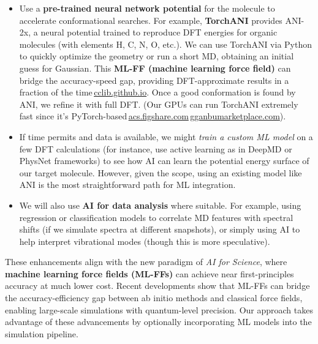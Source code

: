 \documentclass[11pt]{article}
\begin{document}
\begin{itemize}
\begin{itemize}
    \item Use a \textbf{pre-trained neural network potential} for the molecule to accelerate conformational searches. For example, \textbf{TorchANI} provides ANI-2x, a neural potential trained to reproduce DFT energies for organic molecules (with elements H, C, N, O, etc.). We can use TorchANI via Python to quickly optimize the geometry or run a short MD, obtaining an initial guess for Gaussian. This \textbf{ML-FF (machine learning force field)} can bridge the accuracy-speed gap, providing DFT-approximate results in a fraction of the time\,\href{https://cclib.github.io/\#:\~:text=Many\%20types\%20of\%20output\%20data,also\%20provided\%20for\%20interpreting\%20the}{cclib.github.io}. Once a good conformation is found by ANI, we refine it with full DFT. (Our GPUs can run TorchANI extremely fast since it’s PyTorch-based\,\href{https://acs.figshare.com/articles/journal_contribution/TorchANI_2_0_An_Extensible_High-Performance_Library_for_the_Design_Training_and_Use_of_NN-IPs/30388327\#:\~:text=TorchANI\%202.0\%3A\%20An\%20Extensible\%2C\%20High,inference\%2C\%20and\%20the\%20library}{acs.figshare.com}\,\href{https://gganbumarketplace.com/machine-learning/torchani-ani-family-neural-network-potentials-molecular-simulations/\#:\~:text=TorchANI\%20and\%20the\%20ANI\%20Family\%3A,of\%20pretrained\%20models\%20or}{gganbumarketplace.com}).
    \item If time permits and data is available, we might \emph{train a custom ML model} on a few DFT calculations (for instance, use active learning as in DeepMD or PhysNet frameworks) to see how AI can learn the potential energy surface of our target molecule. However, given the scope, using an existing model like ANI is the most straightforward path for ML integration.
    \item We will also use \textbf{AI for data analysis} where suitable. For example, using regression or classification models to correlate MD features with spectral shifts (if we simulate spectra at different snapshots), or simply using AI to help interpret vibrational modes (though this is more speculative).
  \end{itemize}
\end{itemize}

These enhancements align with the new paradigm of \emph{AI for Science}, where \textbf{machine learning force fields (ML-FFs)} can achieve near first-principles accuracy at much lower cost. Recent developments show that ML-FFs can bridge the accuracy-efficiency gap between ab initio methods and classical force fields, enabling large-scale simulations with quantum-level precision. Our approach takes advantage of these advancements by optionally incorporating ML models into the simulation pipeline.
\end{document}
